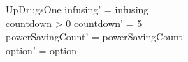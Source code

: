 \begin{schema}{UpDrugsOne}
	infusing' = infusing\\
	countdown > 0 \land countdown' = 5\\
	powerSavingCount' = powerSavingCount\\ option' = option\\
\end{schema}

